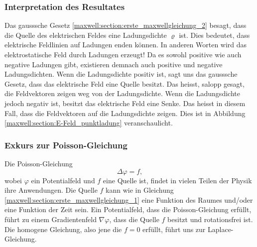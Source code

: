 \subsubsection{Interpretation des Resultates}
Das gausssche Gesetz \eqref{maxwell:section:erste_maxwellgleichung_2} besagt, dass die Quelle des elektrischen Feldes eine Ladungsdichte $\varrho$ ist.
Dies bedeutet, dass elektrische Feldlinien auf Ladungen enden können.
In anderen Worten wird das elektrostatische Feld durch Ladungen erzeugt!
Da es sowohl positive wie auch negative Ladungen gibt, existieren demnach auch positive und negative Ladungsdichten.
Wenn die Ladungsdichte positiv ist, sagt uns das gausssche Gesetz, dass das elektrische Feld eine Quelle besitzt.
Das heisst, salopp gesagt, die Feldvektoren zeigen weg von der Ladungsdichte.
Wenn die Ladungsdichte jedoch negativ ist, besitzt das elektrische Feld eine Senke.
Das heisst in diesem Fall, dass die Feldvektoren auf die Ladungsdichte zeigen. Dies ist in Abbildung \ref{maxwell:section:E-Feld_punktladung} veranschaulicht.

\subsubsection{Exkurs zur Poisson-Gleichung}
Die Poisson-Gleichung
\[
\Delta\varphi
=
f,
\]
wobei $\varphi$ ein Potentialfeld und $f$ eine Quelle ist, findet in vielen Teilen der Physik ihre Anwendungen.
Die Quelle $f$ kann wie in Gleichung \eqref{maxwell:section:erste_maxwellgleichung_1} eine Funktion des Raumes und/oder eine Funktion der Zeit sein.
Ein Potentialfeld, dass die Poisson-Gleichung erfüllt, führt zu einem Gradientenfeld $\nabla\varphi$, dass die Quelle $f$ besitzt und rotationsfrei ist.
Die homogene Gleichung, also jene die $f = 0$ erfüllt, führt uns zur Laplace-Gleichung.







